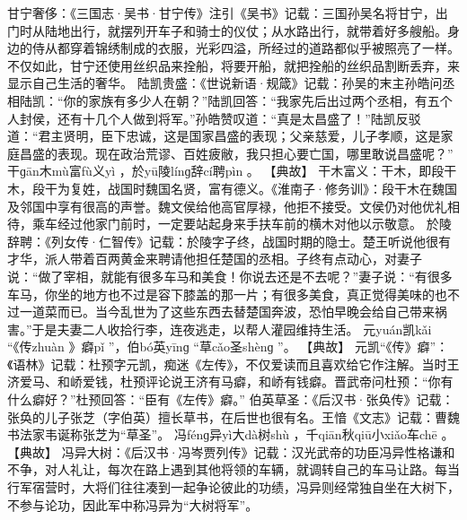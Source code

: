\documentclass[12pt,UTF8]{ctexbook}
\begin{document}
甘宁奢侈：《三国志·吴书·甘宁传》注引《吴书》记载：三国孙吴名将甘宁，出门时从陆地出行，就摆列开车子和骑士的仪仗；从水路出行，就带着好多艘船。身边的侍从都穿着锦绣制成的衣服，光彩四溢，所经过的道路都似乎被照亮了一样。不仅如此，甘宁还使用丝织品来拴船，将要开船，就把拴船的丝织品割断丢弃，来显示自己生活的奢华。
陆凯贵盛：《世说新语·规箴》记载：孙吴的末主孙皓问丞相陆凯：“你的家族有多少人在朝？”陆凯回答：“我家先后出过两个丞相，有五个人封侯，还有十几个人做到将军。”孙皓赞叹道：“真是太昌盛了！”陆凯反驳道：“君主贤明，臣下忠诚，这是国家昌盛的表现；父亲慈爱，儿子孝顺，这是家庭昌盛的表现。现在政治荒谬、百姓疲敝，我只担心要亡国，哪里敢说昌盛呢？”
干ɡān木mù富fù义yì
，於yū陵línɡ辞cí聘pìn
。
【典故】
干木富义：干木，即段干木，段干为复姓，战国时魏国名贤，富有德义。《淮南子·修务训》：段干木在魏国及邻国中享有很高的声誉。魏文侯给他高官厚禄，他拒不接受。文侯仍对他优礼相待，乘车经过他家门前时，一定要站起身来手扶车前的横木对他以示敬意。
於陵辞聘：《列女传·仁智传》记载：於陵字子终，战国时期的隐士。楚王听说他很有才华，派人带着百两黄金来聘请他担任楚国的丞相。子终有点动心，对妻子说：“做了宰相，就能有很多车马和美食！你说去还是不去呢？”妻子说：“有很多车马，你坐的地方也不过是容下膝盖的那一片；有很多美食，真正觉得美味的也不过一道菜而已。当今乱世为了这些东西去替楚国奔波，恐怕早晚会给自己带来祸害。”于是夫妻二人收拾行李，连夜逃走，以帮人灌园维持生活。
元yuán凯kǎi
“《传zhuàn
》癖pǐ
”，伯bó英yīnɡ
“草cǎo圣shènɡ
”。
【典故】
元凯“《传》癖”：《语林》记载：杜预字元凯，痴迷《左传》，不仅爱读而且喜欢给它作注解。当时王济爱马、和峤爱钱，杜预评论说王济有马癖，和峤有钱癖。晋武帝问杜预：“你有什么癖好？”杜预回答：“臣有《左传》癖。”
伯英草圣：《后汉书·张奂传》记载：张奂的儿子张芝（字伯英）擅长草书，在后世也很有名。王愔《文志》记载：曹魏书法家韦诞称张芝为“草圣”。
冯fénɡ异yì大dà树shù
，千qiān秋qiū小xiǎo车chē
。
【典故】
冯异大树：《后汉书·冯岑贾列传》记载：汉光武帝的功臣冯异性格谦和不争，对人礼让，每次在路上遇到其他将领的车辆，就调转自己的车马让路。每当行军宿营时，大将们往往凑到一起争论彼此的功绩，冯异则经常独自坐在大树下，不参与论功，因此军中称冯异为“大树将军”。
\end{document}
